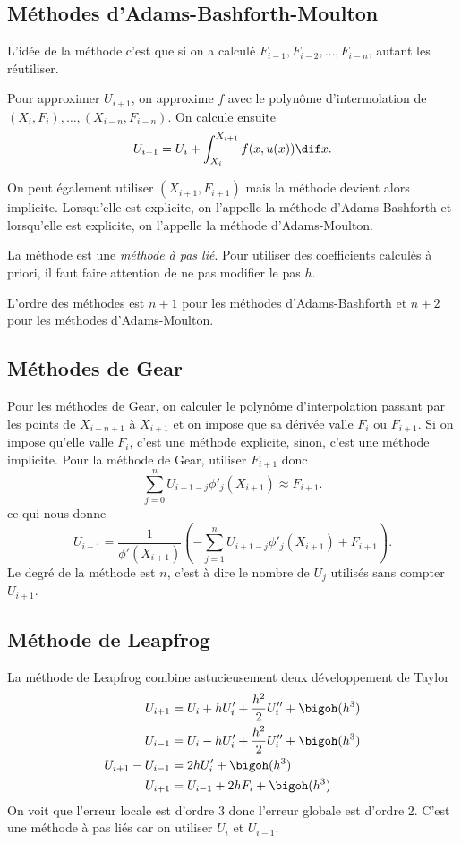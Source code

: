 \subsection{Méthodes d'Adams-Bashforth-Moulton}
L'idée de la méthode c'est que si on a calculé
$F_{i-1}, F_{i-2}, \ldots, F_{i-n}$,
autant les réutiliser.

Pour approximer $U_{i+1}$,
on approxime $f$ avec le polynôme d'intermolation de
$(X_i, F_i), \ldots, (X_{i-n},F_{i-n})$.
On calcule ensuite
\[ U_{i+1} = U_i + \int_{X_i}^{X_{i+1}}f(x,u(x))\dif x. \]

On peut également utiliser $(X_{i+1}, F_{i+1})$ mais la méthode devient
alors implicite.
Lorsqu'elle est explicite, on l'appelle la méthode
d'Adams-Bashforth et lorsqu'elle est explicite, on l'appelle
la méthode d'Adams-Moulton.

La méthode est une \emph{méthode à pas lié}.
Pour utiliser des coefficients calculés à priori,
il faut faire attention de ne pas modifier le pas $h$.

L'ordre des méthodes est $n+1$ pour les méthodes d'Adams-Bashforth et
$n+2$ pour les méthodes d'Adams-Moulton.

\subsection{Méthodes de Gear}
Pour les méthodes de Gear,
on calculer le polynôme d'interpolation passant par les points de
$X_{i-n+1}$ à $X_{i+1}$ et on impose que sa dérivée valle $F_i$ ou
$F_{i+1}$.
Si on impose qu'elle valle $F_i$, c'est une méthode explicite,
sinon, c'est une méthode implicite.
Pour la méthode de Gear, utiliser $F_{i+1}$ donc
\[ \sum_{j=0}^n U_{i+1-j}\phi'_j(X_{i+1}) \approx F_{i+1}. \]
ce qui nous donne
\[ U_{i+1} = \frac{1}{\phi'(X_{i+1})}
\left(-\sum_{j=1}^n U_{i+1-j}\phi'_j(X_{i+1}) + F_{i+1}\right). \]
Le degré de la méthode est $n$, c'est à dire le nombre de $U_j$ utilisés
sans compter $U_{i+1}$.

\subsection{Méthode de Leapfrog}
La méthode de Leapfrog combine astucieusement deux développement de Taylor
\begin{align*}
  U_{i+1} & = U_i + hU_i' + \frac{h^2}{2}U_i'' + \bigoh(h^3)\\
  U_{i-1} & = U_i - hU_i' + \frac{h^2}{2}U_i'' + \bigoh(h^3)\\
  U_{i+1} - U_{i-1} & = 2hU_i' + \bigoh(h^3)\\
  U_{i+1} & = U_{i-1} + 2hF_i + \bigoh(h^3)
\end{align*}
On voit que l'erreur locale est d'ordre 3 donc l'erreur
globale est d'ordre 2.
C'est une méthode à pas liés car on utiliser $U_i$ et $U_{i-1}$.

